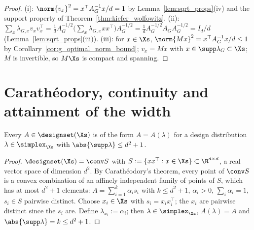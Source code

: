 \begin{proof}
\leanok
{}
(i): $\norm{v_x}^2 = x^\top A_G^{-1}x/d = 1$ by Lemma~\ref{lem:sqrt_props}(iv) and the support
property of Theorem~\ref{thm:kiefer_wolfowitz}. (ii):
$\sum_x\lambda_{G,x}v_xv_x^\top = \frac1d A_G^{-1/2}\big(\sum_x\lambda_{G,x}xx^\top\big)A_G^{-1/2}
= \frac1d A_G^{-1/2}A_GA_G^{-1/2} = I_d/d$ (Lemma~\ref{lem:sqrt_props}(iii)). (iii): for
$x \in \Xs$, $\norm{Mx}^2 = x^\top A_G^{-1}x/d \le 1$ by Corollary~\ref{cor:g_optimal_norm_bound};
$v_x = Mx$ with $x \in \supp\lambda_G \subset \Xs$; $M$ is invertible, so $M\Xs$ is compact and
spanning.
\end{proof}

\section{Carath\'eodory, continuity and attainment of the width}
\label{sec:design_caratheodory}

\begin{lemma}\label{lem:caratheodory_design}
\leanok
{}
Every $A \in \designset(\Xs)$ is of the form $A = A(\lambda)$ for a design distribution
$\lambda \in \simplex_{\Xs}$ with $\abs{\supp\lambda} \le d^2 + 1$.
\end{lemma}

\begin{proof}
\leanok
{}
$\designset(\Xs) = \conv S$ with $S := \{xx^\top : x \in \Xs\} \subset \R^{d\times d}$, a real
vector space of dimension $d^2$. By Carath\'eodory's theorem, every point of $\conv S$
is a convex combination of an affinely independent family of points of $S$, which has at most
$d^2 + 1$ elements: $A = \sum_{i=1}^k \alpha_i s_i$ with $k \le d^2+1$, $\alpha_i > 0$,
$\sum_i\alpha_i = 1$, $s_i \in S$ pairwise distinct. Choose $x_i \in \Xs$ with $s_i = x_ix_i^\top$;
the $x_i$ are pairwise distinct since the $s_i$ are. Define $\lambda_{x_i} := \alpha_i$; then
$\lambda \in \simplex_{\Xs}$, $A(\lambda) = A$ and $\abs{\supp\lambda} = k \le d^2 + 1$.
\end{proof}

